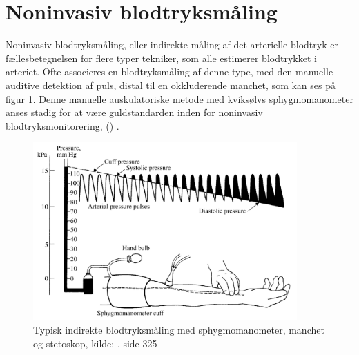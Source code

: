 \section{Noninvasiv blodtryksmåling}\label{noninvasivBloodpressureMeasurement}
Noninvasiv blodtryksmåling, eller indirekte måling af det arterielle blodtryk er fællesbetegnelsen for flere typer tekniker, som alle estimerer blodtrykket i arteriet. Ofte associeres en blodtryksmåling af denne type, med den manuelle auditive detektion af puls, distal til en okkluderende manchet, som kan ses på figur \ref{fig:audiotoryBloodpressureMeasurement}. Denne manuelle auskulatoriske metode med kviksølvs sphygmomanometer anses stadig for at være guldstandarden inden for noninvasiv blodtryksmonitorering, (\cite{RefWorks:24}) .

\begin{figure}[H]
	\centering
	\includegraphics[width=0.9\textwidth]{billeder/TypicalIndirectBlood-pressureMeasurement.png}
	\caption{Typisk indirekte blodtryksmåling med sphygmomanometer, manchet og stetoskop, kilde: \cite{RefWorks:27}, side 325}\label{fig:audiotoryBloodpressureMeasurement}
\end{figure}


